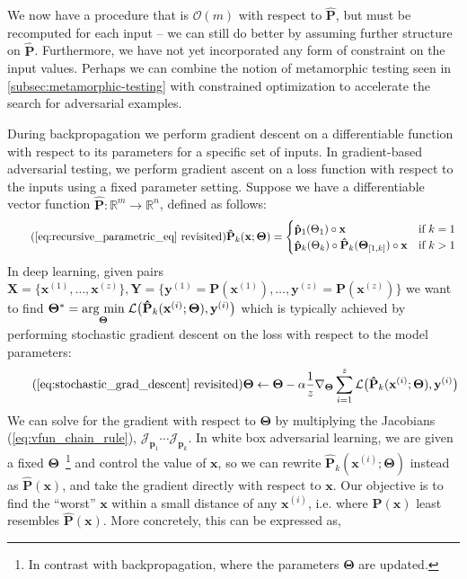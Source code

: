 We now have a procedure that is $\mathcal{O}(m)$ with respect to $\mathbf{\hat P}$, but must be recomputed for each input -- we can still do better by assuming further structure on $\mathbf{\hat P}$. Furthermore, we have not yet incorporated any form of constraint on the input values. Perhaps we can combine the notion of metamorphic testing seen in \autoref{subsec:metamorphic-testing} with constrained optimization to accelerate the search for adversarial examples.

During backpropagation we perform gradient descent on a differentiable function with respect to its parameters for a specific set of inputs. In gradient-based adversarial testing, we perform gradient ascent on a loss function with respect to the inputs using a fixed parameter setting. Suppose we have a differentiable vector function $\mathbf{\hat P}: \mathbb{R}^m\rightarrow\mathbb{R}^n$, defined as follows:
%
\begin{equation} \tag{\autoref{eq:recursive_parametric_eq} revisited}
\mathbf{\hat P}_k(\mathbf{x}; \bm\Theta) = \begin{cases} \mathbf{\hat p}_1(\Theta_1)\circ\mathbf{x} &\text{if } k=1\\ \mathbf{\hat p}_k(\Theta_k)\circ \mathbf{\hat P}_{k}(\bm\Theta_{[1, k]})\circ\mathbf{x}&\text{if } k > 1 \end{cases} \\
\end{equation}
%
In deep learning, given pairs $\mathbf{X} = \{\mathbf{x}^{(1)}, \dots, \mathbf{x}^{(z)}\}, \mathbf{Y} = \{\mathbf{y}^{(1)} = \mathbf{P}(\mathbf{x}^{(1)}), \dots, \mathbf{y}^{(z)} = \mathbf{P}(\mathbf{x}^{(z)})\}$ we want to find $\bm\Theta^* = \underset{\boldsymbol{\Theta}}{\operatorname{arg}\,\operatorname{min}}\;\mathcal{L}\big(\mathbf{\hat P}_k(\mathbf{x}^{(i)}; \bm\Theta), \mathbf{y}^{(i)}\big)$ which is typically achieved by performing stochastic gradient descent on the loss with respect to the model parameters:
%
\begin{equation} \tag{\autoref{eq:stochastic_grad_descent} revisited}
\bm\Theta \leftarrow \bm\Theta - \alpha\frac{1}{z}\nabla_{\bm\Theta} \sum_{i=1}^z\mathcal{L}\big(\mathbf{\hat P}_k(\mathbf{x}^{(i)}; \bm\Theta), \mathbf{y}^{(i)}\big)
\end{equation}
%
We can solve for the gradient with respect to $\bm\Theta$ by multiplying the Jacobians (\autoref{eq:vfun_chain_rule}), $\mathcal{J}_{\mathbf{p}_1} \cdots \mathcal{J}_{\mathbf{p}_k}$. In white box adversarial learning, we are given a fixed $\bm\Theta$~\footnote{In contrast with backpropagation, where the parameters $\bm\Theta$ are updated.} and control the value of $\mathbf x$, so we can rewrite $\mathbf{\hat P}_k(\mathbf{x}^{(i)};\bm\Theta)$ instead as $\mathbf{\hat P}(\mathbf x)$, and take the gradient directly with respect to $\mathbf x$. Our objective is to find the ``worst'' $\mathbf x$ within a small distance of any $\mathbf x^{(i)}$, i.e. where $\mathbf{P}(\mathbf x)$ least resembles $\mathbf{\hat P}(\mathbf x)$. More concretely, this can be expressed as,
